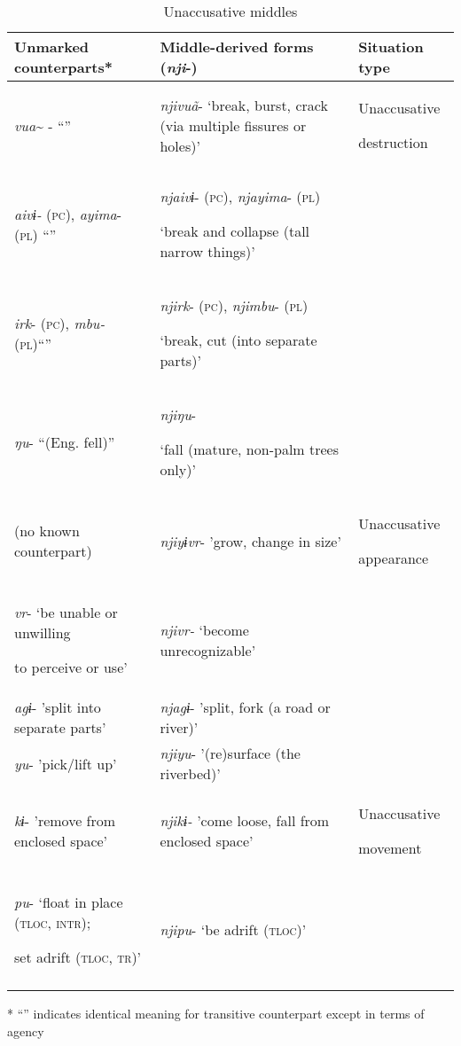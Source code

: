 \documentclass[output=paper]{langscibook}
\begin{document}
\begin{table}
\caption{Unaccusative middles}
\label{tab:brooks:4}
\begin{tabularx}{\textwidth}{XXX}

\lsptoprule
 {Unmarked} {counterparts*} & {Middle-derived} {forms} {(\textit{nji}}{-)} & { {Situation} {type}}\\
\midrule
 \textit{vua}\~{} - “” & \textit{njivuã}- ‘break, burst, crack (via multiple fissures or holes)’ & {{ Unaccusative}

 destruction}\\
 \textit{aivɨ-} (\textsc{pc}), \textit{ayima}- (\textsc{pl}) “” & { \textit{njaivɨ}- (\textsc{pc}), \textit{njayima}- \textsc{(pl})}

 ‘break and collapse (tall narrow things)’ & \\
 \textit{irk}- (\textsc{pc}), \textit{mbu-} (\textsc{pl})“” & { \textit{njirk}- (\textsc{pc}), \textit{njimbu}- (\textsc{pl})}

 ‘break, cut (into separate parts)’ & \\
 \textit{ŋu}- “(Eng. fell)” & { \textit{njiŋu}-}

 ‘fall (mature, non-palm trees only)’ & \\
 (no known counterpart) & \textit{njiyɨvr}- 'grow, change in size' & {{ Unaccusative}

{ appearance}

}\\
{ \textit{vr}- ‘be unable or unwilling}

 to perceive or use’ & \textit{njivr-} ‘become unrecognizable’ & \\
 \textit{agɨ}- 'split into separate parts' & \textit{njagɨ}- 'split, fork (a road or river)' & \\
 \textit{yu}- 'pick/lift up' & \textit{njiyu}- '(re)surface (the riverbed)' & \\
 \textit{kɨ}- 'remove from enclosed space' & \textit{njikɨ-} 'come loose, fall from enclosed space' & {{ Unaccusative}

 movement}\\
{ \textit{pu}- ‘float in place (\textsc{tloc,} \textsc{intr});}

 set adrift (\textsc{tloc,} \textsc{tr})’ & \textit{njipu}- ‘be adrift (\textsc{tloc})’ & \\
\lspbottomrule
\end{tabularx}
* “” indicates identical meaning for transitive counterpart except in terms of agency
\end{table}
\end{document}

